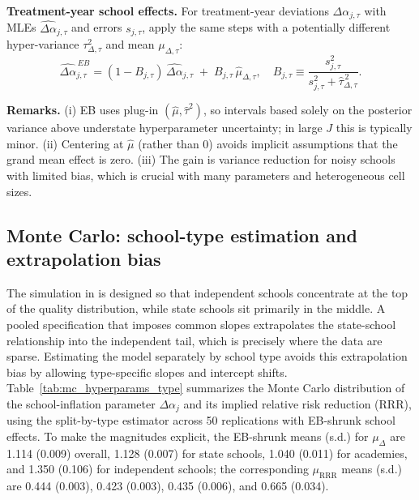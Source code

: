 \medskip
\noindent\textbf{Treatment-year school effects.}
For treatment-year deviations $\Delta\alpha_{j,\tau}$ with MLEs $\widehat{\Delta\alpha}_{j,\tau}$ and errors $s_{j,\tau}$, apply the same steps with a potentially different hyper-variance $\tau^2_{\Delta,\tau}$ and mean $\mu_{\Delta,\tau}$:
\[
\widehat{\Delta\alpha}^{\,EB}_{j,\tau}
= (1-B_{j,\tau})\,\widehat{\Delta\alpha}_{j,\tau} \;+\; B_{j,\tau}\,\widehat{\mu}_{\Delta,\tau},
\quad
B_{j,\tau} \equiv \frac{s_{j,\tau}^2}{s_{j,\tau}^2 + \widehat{\tau}_{\Delta,\tau}^{\,2}}.
\]

\medskip
\noindent\textbf{Remarks.}
(i) EB uses plug-in $(\widehat{\mu},\widehat{\tau}^2)$, so intervals based solely on the posterior variance above understate hyperparameter uncertainty; in large $J$ this is typically minor. (ii) Centering at $\widehat{\mu}$ (rather than $0$) avoids implicit assumptions that the grand mean effect is zero. (iii) The gain is variance reduction for noisy schools with limited bias, which is crucial with many parameters and heterogeneous cell sizes.


\subsection{Monte Carlo: school-type estimation and extrapolation bias}
\label{app:mc_school_type}
The simulation in  is designed so that independent schools concentrate at the top of the
quality distribution, while state schools sit primarily in the middle. A pooled specification that imposes
common slopes extrapolates the state-school relationship into the independent tail, which is precisely where
the data are sparse. Estimating the model separately by school type avoids this extrapolation bias by allowing
type-specific slopes and intercept shifts. Table~\ref{tab:mc_hyperparams_type} summarizes the Monte Carlo
distribution of the school-inflation parameter $\Delta\alpha_j$ and its implied relative risk reduction (RRR),
using the split-by-type estimator across 50 replications with EB-shrunk school effects.
To make the magnitudes explicit, the EB-shrunk means (s.d.) for $\mu_{\Delta}$ are
1.114 (0.009) overall, 1.128 (0.007) for state schools, 1.040 (0.011) for academies, and 1.350 (0.106) for
independent schools; the corresponding $\mu_{\mathrm{RRR}}$ means (s.d.) are 0.444 (0.003), 0.423 (0.003),
0.435 (0.006), and 0.665 (0.034).

